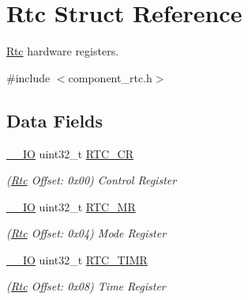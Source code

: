 \hypertarget{structRtc}{}\section{Rtc Struct Reference}
\label{structRtc}


\mbox{\hyperlink{structRtc}{Rtc}} hardware registers.  




{\ttfamily \#include $<$component\+\_\+rtc.\+h$>$}

\subsection*{Data Fields}
\begin{DoxyCompactItemize}
\item 
\mbox{\label{structRtc_aff533e6c594b3aac7a5b7e286d091d93}} 
\mbox{\hyperlink{core__cm7_8h_aec43007d9998a0a0e01faede4133d6be}{\+\_\+\+\_\+\+IO}} uint32\+\_\+t \mbox{\hyperlink{structRtc_aff533e6c594b3aac7a5b7e286d091d93}{R\+T\+C\+\_\+\+CR}}
\begin{DoxyCompactList}\small\item\em (\mbox{\hyperlink{structRtc}{Rtc}} Offset\+: 0x00) Control Register \end{DoxyCompactList}\item 
\mbox{\label{structRtc_a32cfdc7be18f90336bff7ff41f43397b}} 
\mbox{\hyperlink{core__cm7_8h_aec43007d9998a0a0e01faede4133d6be}{\+\_\+\+\_\+\+IO}} uint32\+\_\+t \mbox{\hyperlink{structRtc_a32cfdc7be18f90336bff7ff41f43397b}{R\+T\+C\+\_\+\+MR}}
\begin{DoxyCompactList}\small\item\em (\mbox{\hyperlink{structRtc}{Rtc}} Offset\+: 0x04) Mode Register \end{DoxyCompactList}\item 
\mbox{\label{structRtc_a69364f32eee69e7e2d14bea6f8b49100}} 
\mbox{\hyperlink{core__cm7_8h_aec43007d9998a0a0e01faede4133d6be}{\+\_\+\+\_\+\+IO}} uint32\+\_\+t \mbox{\hyperlink{structRtc_a69364f32eee69e7e2d14bea6f8b49100}{R\+T\+C\+\_\+\+T\+I\+MR}}
\begin{DoxyCompactList}\small\item\em (\mbox{\hyperlink{structRtc}{Rtc}} Offset\+: 0x08) Time Register \end{DoxyCompactList}\item 
\mbox{\label{structRtc_ab7a5a222639a2f970a255b4d5b79000b}} 

\end{DoxyCompactItemize}
